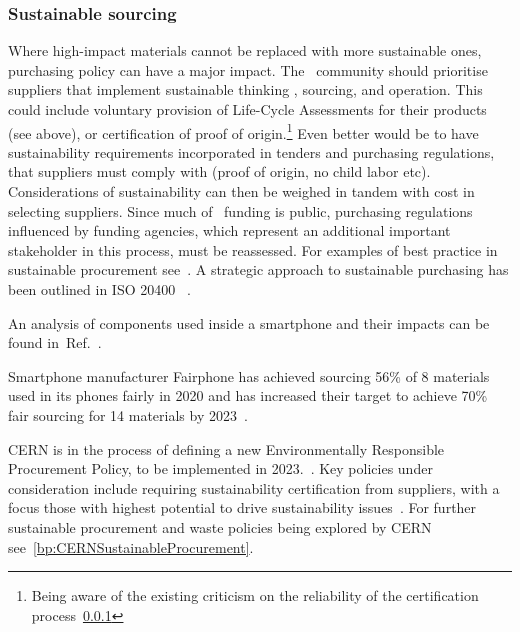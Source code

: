 \documentclass[../SustainableHEP.tex]{subfiles}
\begin{document}
\subsubsection{Sustainable sourcing \label{sec:sustainablesourcing}}

Where high-impact materials cannot be replaced with more sustainable ones, purchasing policy can have a major impact. 
The \ACR\ community should prioritise suppliers that implement sustainable thinking , sourcing,  and operation. This could include voluntary provision of Life-Cycle Assessments for their products (see above), or certification of \eg proof of origin.\footnote{Being aware of the existing criticism on the reliability of the certification process~\ref{}}  Even better would be to have sustainability requirements incorporated in tenders and purchasing regulations, that suppliers must comply with (\eg  proof of origin, no child labor etc).  Considerations of sustainability can then be weighed in tandem with cost in selecting suppliers.  Since much of \ACR\ funding is public, purchasing regulations influenced by funding agencies, which represent an additional important stakeholder in this process, must be reassessed.  For examples of best practice in sustainable procurement see~.  A strategic approach to sustainable purchasing has been outlined in ISO 20400 ~\cite{ISO20400}.  

An analysis of components used inside a smartphone and their impacts can be found in~Ref.~\cite{fairphone}. 

Smartphone manufacturer Fairphone has achieved sourcing 56\% of 8 materials used in its phones fairly in 2020 and has increased their target to achieve 70\% fair sourcing for 14 materials by 2023~\cite{fairphone2}. 

CERN is in the process of defining a new Environmentally Responsible Procurement Policy, to be implemented in 2023.~\cite{Hartley}.  Key policies under consideration include requiring sustainability certification from suppliers, with a focus those with highest potential to drive sustainability issues~\cite{Hartley}.  For further sustainable procurement and waste policies being explored by CERN see~\ref{bp:CERNSustainableProcurement}.  
\end{document}
